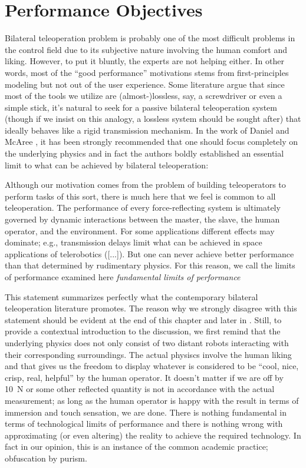 \chapter{Performance Objectives}
\label{chap:perf}

Bilateral teleoperation problem is probably one of the most difficult problems in the control field due to its 
subjective nature involving the human comfort and liking. However, to put it bluntly, the experts are not helping 
either. In other words, most of the \enquote{good performance} motivations stems from first-principles modeling 
but not out of the user experience. 
Some literature argue that since most of the tools we utilize are (almost-)lossless, say, a 
screwdriver or even a simple stick, it's natural to seek for a passive bilateral teleoperation system (though if we
insist on this analogy, a lossless system should be sought after) that ideally behaves like a rigid transmission mechanism. In the work of 
Daniel and McAree \cite{danielmcaree}, it has been strongly recommended that one should focus completely on the underlying physics and in 
fact the authors boldly established an essential limit to what can be achieved by bilateral teleoperation:
\begin{displayquote}
Although our motivation comes from the problem of building teleoperators to perform tasks of this sort, there is much here that we feel is 
common to all teleoperation. The performance of every force-reflecting system is ultimately governed by dynamic interactions between the 
master, the slave, the human operator, and the environment. For some applications different effects may dominate; e.g., transmission delays
limit what can be achieved in space applications of telerobotics ([...]). But one can never achieve better performance than that determined 
by rudimentary physics. For this reason, we call the limits of performance examined here \emph{fundamental limits of performance}
\end{displayquote}
This statement summarizes perfectly what the contemporary bilateral teleoperation literature promotes. The reason why we strongly 
disagree with this statement should be evident at the end of this chapter and later in . Still, to provide a contextual 
introduction to the discussion, we first remind that the underlying physics does not only consist of two distant robots interacting with 
their corresponding surroundings. The actual physiscs involve the human liking and that gives us the freedom to display whatever is considered 
to be \enquote{cool, nice, crisp, real, helpful} by the human operator. It doesn't matter if we are off by \SI{10}{\newton} or some other reflected 
quantity is not in accordance with the actual measurement; as long as the human operator is happy with the result in terms of immersion and 
touch sensation, we are done. There is nothing fundamental in terms of technological limits of performance and there is nothing wrong with 
approximating (or even altering) the reality to achieve the required technology. In fact in our opinion, this is an instance of the common academic 
practice; obfuscation by purism.

